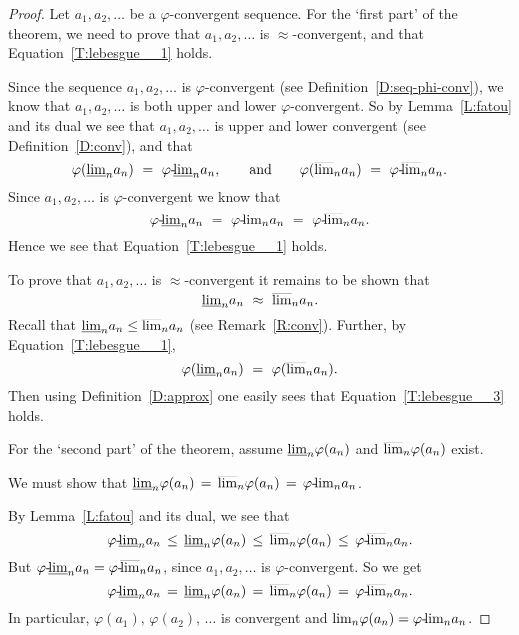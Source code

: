 \documentclass[main.tex]{subfiles}
\begin{document}
\begin{proof}
Let $a_1,a_2,\dotsc$ be a $\varphi$-convergent sequence.
For the `first part' of the theorem,
we need to prove that $a_1,a_2,\dotsc$
is $\approx$-convergent,
and that Equation~\eqref{T:lebesgue__1} holds.

Since the sequence $a_1,a_2,\dotsc$ is $\varphi$-convergent
 (see Definition~\ref{D:seq-phi-conv}),
we know
that
$a_1,a_2,\dotsc$
is both upper and lower $\varphi$-convergent.
So by Lemma~\ref{L:fatou} and its dual we see that
$a_1,a_2,\dotsc$ is 
upper and lower convergent (see Definition~\ref{D:conv}),
and that
\begin{equation*}
\varphi(\llim{n} a_n) \ = \ \pllim\varphi{n}a_n,
\qquad\text{and}\qquad
\varphi(\ulim{n} a_n) \ =\ \pulim\varphi{n}a_n.
\end{equation*}
Since $a_1,a_2,\dotsc$
is $\varphi$-convergent
we know that
\begin{equation*}
\pllim\varphi{n}a_n \ = \ 
\plim\varphi{n}a_n \ = \ \pulim\varphi{n}a_n.
\end{equation*}
Hence we see that Equation~\eqref{T:lebesgue__1} holds.

To prove that $a_1,a_2,\dotsc$
is $\approx$-convergent
it remains to be shown that
\begin{equation}
\label{T:lebesgue__3}
\smash{\underline{\lim}_{n}} a_n \ \approx\ \smash{\overline{\lim}_{n}} a_n.
\end{equation}
Recall that $\smash{\underline{\lim}_{n}}a_n \leq \smash{\overline{\lim}_{n}}a_n$
(see Remark~\ref{R:conv}).
Further, 
by Equation~\eqref{T:lebesgue__1},
\begin{equation*}
\varphi(\smash{\underline{\lim}_{n}}a_n) \ =\ \varphi( \smash{\overline{\lim}_{n}}a_n).
\end{equation*}
Then using Definition~\ref{D:approx}
one easily sees that Equation~\eqref{T:lebesgue__3} holds.

For the `second part' of the theorem,
assume  $\smash{\underline{\lim}_{n}}\varphi(a_n)$ and $\smash{\overline{\lim}_{n}}\varphi(a_n)$ exist.

We must show that
$\smash{\underline{\lim}_{n}}\varphi(a_n) \,=\,\smash{\overline{\lim}_{n}}\varphi(a_n) \,=\, {\varphi}\text{-}\!{\lim}_{n}{a_n}$.

By Lemma~\ref{L:fatou} and its dual, we see that
\begin{equation*}
{\varphi}\text{-}\!\smash{\underline{\lim}_{n}}a_n \,\leq\,
\smash{\underline{\lim}_{n}}\varphi(a_n) \,\leq\,
\smash{\overline{\lim}_{n}}\varphi(a_n) \,\leq\,
{\varphi}\text{-}\!\smash{\overline{\lim}_{n}}a_n.
\end{equation*}
But ${\varphi}\text{-}\!\smash{\underline{\lim}_{n}}a_n = {\varphi}\text{-}\!\smash{\overline{\lim}_{n}}a_n$,
since $a_1,a_2,\dotsc$ is $\varphi$-convergent.
So we get 
\begin{equation*}
{\varphi}\text{-}\!\smash{\underline{\lim}_{n}}a_n \,=\,
\smash{\underline{\lim}_{n}}\varphi(a_n) \,=\,
\smash{\overline{\lim}_{n}}\varphi(a_n) \,=\,
{\varphi}\text{-}\!\smash{\overline{\lim}_{n}}a_n.
\end{equation*}
In particular,
$\varphi(a_1),\,\varphi(a_2),\,\dotsc$
is convergent and ${\lim}_n\varphi(a_n) = {\varphi}\text{-}\!{\lim}_{n}a_n$.
\end{proof}
\end{document}
